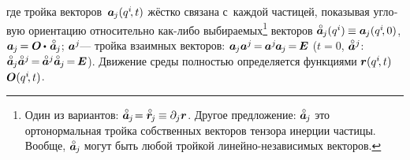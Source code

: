 \begin{otherlanguage}{russian}
\vspace{-0.1em} \noindent где тройка векторов~${\bm{a}_{\hspace{-0.12ex}j}(q^i\hspace{-0.4ex}, t)}$ жёстко связана с~каждой частицей, показывая угловую ориентацию относительно как\hbox{-}либо выбираемых\footnote{%
Один из вариантов: ${\mathcircabove{\bm{a}}_{\hspace{-0.12ex}j} \hspace{-0.4ex} = \initiallocationvector_{\hspace{-0.2ex}j} \hspace{-0.1ex} \equiv \partial_j \currentlocationvector}$.
Другое предложение: ${\mathcircabove{\bm{a}}_{\hspace{-0.12ex}j} \hspace{-0.2ex}}$ это ортонормальная тройка собственных векторов тензора инерции частицы. %
Вообще, ${\mathcircabove{\bm{a}}_{\hspace{-0.12ex}j} \hspace{-0.2ex}}$ могут быть любой тройкой линейно-независимых векторов.
}\hspace{-0.2ex}
векторов
${\mathcircabove{\bm{a}}_{\hspace{-0.12ex}j}(q^i) \hspace{-0.1ex} \equiv \bm{a}_{\hspace{-0.12ex}j}(q^i\hspace{-0.4ex}, 0)}$,
${\bm{a}_{\hspace{-0.12ex}j} \hspace{-0.2ex} = \rotationtensor \hspace{-0.1ex} \dotp \hspace{.2ex} \mathcircabove{\bm{a}}_{\hspace{-0.12ex}j}}$;
${\bm{a}^j\hspace{-0.2ex}}$\:--- тройка взаимных векторов:
${\bm{a}_{\hspace{-0.12ex}j} \bm{a}^j \hspace{-0.25ex}
= \hspace{-0.15ex} \bm{a}^j \hspace{-0.2ex} \bm{a}_{\hspace{-0.12ex}j} \hspace{-0.25ex}
= \hspace{-0.2ex} \bm{E}}$
(${t\!=\!0}$, ${\mathcircabove{\bm{a}}^j}$: ${\mathcircabove{\bm{a}}_{\hspace{-0.12ex}j} \mathcircabove{\bm{a}}^j \hspace{-0.25ex} = \hspace{-0.15ex} \mathcircabove{\bm{a}}^j \mathcircabove{\bm{a}}_{\hspace{-0.12ex}j} \hspace{-0.25ex} = \hspace{-0.2ex} \UnitDyad}$).
Движение среды полностью определяется функциями ${\bm{r}(q^i\hspace{-0.4ex}, t)}$ ~${\bm{O}(q^i\hspace{-0.4ex}, t)}$.


\end{otherlanguage}
